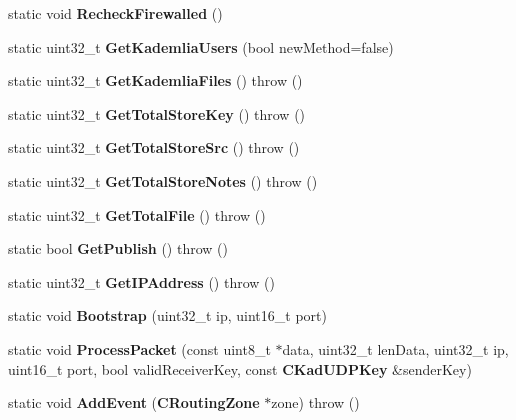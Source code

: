 \begin{DoxyCompactItemize}
\item 
static void {\bfseries RecheckFirewalled} ()\label{classKademlia_1_1CKademlia_ac5176f0f919c107502afd6a87e8508e1}

\item 
static uint32\_\-t {\bfseries GetKademliaUsers} (bool newMethod=false)\label{classKademlia_1_1CKademlia_ac59ab900c1694877f03fc9a75869ad08}

\item 
static uint32\_\-t {\bfseries GetKademliaFiles} ()  throw ()\label{classKademlia_1_1CKademlia_ab2a3d0c114cc6d3d78d3657d9628542a}

\item 
static uint32\_\-t {\bfseries GetTotalStoreKey} ()  throw ()\label{classKademlia_1_1CKademlia_a8acf9b33e80d82febeed33464297aa70}

\item 
static uint32\_\-t {\bfseries GetTotalStoreSrc} ()  throw ()\label{classKademlia_1_1CKademlia_a1a05168e440ccea6d98a771cad71d76f}

\item 
static uint32\_\-t {\bfseries GetTotalStoreNotes} ()  throw ()\label{classKademlia_1_1CKademlia_afeb61ac8551de5de32ee608e5161a596}

\item 
static uint32\_\-t {\bfseries GetTotalFile} ()  throw ()\label{classKademlia_1_1CKademlia_a1c4a7fd0c0f78d00bf9ab48870594467}

\item 
static bool {\bfseries GetPublish} ()  throw ()\label{classKademlia_1_1CKademlia_a84e7e002288754fea6f9841c39783140}

\item 
static uint32\_\-t {\bfseries GetIPAddress} ()  throw ()\label{classKademlia_1_1CKademlia_a89d847e4e9ac924c1b1e447f096224a5}

\item 
static void {\bfseries Bootstrap} (uint32\_\-t ip, uint16\_\-t port)\label{classKademlia_1_1CKademlia_a7533a54eda7234a8187a4af5f6cb68cc}

\item 
static void {\bfseries ProcessPacket} (const uint8\_\-t $\ast$data, uint32\_\-t lenData, uint32\_\-t ip, uint16\_\-t port, bool validReceiverKey, const {\bf CKadUDPKey} \&senderKey)\label{classKademlia_1_1CKademlia_ad421f5f98ad5310d608add16d532f735}

\item 
static void {\bfseries AddEvent} ({\bf CRoutingZone} $\ast$zone)  throw ()\label{classKademlia_1_1CKademlia_a3bc3d5e8e0de9b87d0b51e6ac70b3282}


\end{DoxyCompactItemize}
